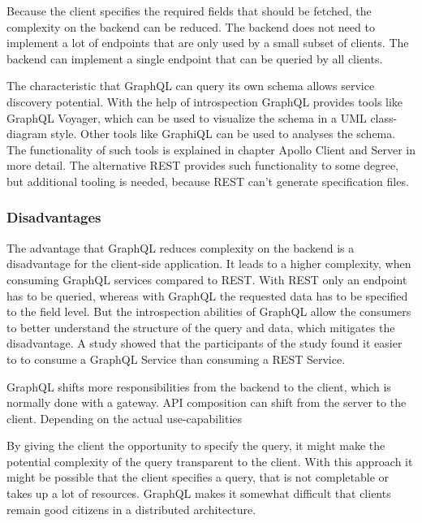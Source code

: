 \bigskip

\noindent Because the client specifies the required fields that should be fetched, the complexity on the backend can be reduced. The backend does not need to implement a lot of endpoints that are only used by a small subset of clients. The backend can implement a single endpoint that can be queried by all clients. \cite{book:2018:richardson:background:bff:microservices-patterns}

\bigskip

\noindent The characteristic that GraphQL can query its own schema allows service discovery potential. With the help of introspection GraphQL provides tools like GraphQL Voyager, which can be used to visualize the schema in a UML class-diagram style. Other tools like GraphiQL can be used to analyses the schema. The functionality of such tools is explained in chapter Apollo Client and Server in more detail. The alternative REST provides such functionality to some degree, but additional tooling is needed, because REST can't generate specification files.


\subsubsection{Disadvantages}

\noindent The advantage that GraphQL reduces complexity on the backend is a disadvantage for the client-side application. It leads to a higher complexity, when consuming GraphQL services compared to REST. With REST only an endpoint has to be queried, whereas with GraphQL the requested data has to be specified to the field level. But the introspection abilities of GraphQL allow the consumers to better understand the structure of the query and data, which mitigates the disadvantage. A study \cite{inproceedings:2020:brito:background:graphql:rest-vs-graphql} showed that the participants of the study found it easier to to consume a GraphQL Service than consuming a REST Service.


\bigskip

\noindent GraphQL shifts more responsibilities from the backend to the client, which is normally done with a gateway. API composition can shift from the server to the client. Depending on the actual use-capabilities

\bigskip

\noindent By giving the client the opportunity to specify the query, it might make the potential complexity of the query transparent to the client. With this approach it might be possible that the client specifies a query, that is not completable or takes up a lot of resources. GraphQL makes it somewhat difficult that clients remain good citizens in a distributed architecture. \cite{book:2018:richardson:background:bff:microservices-patterns}






